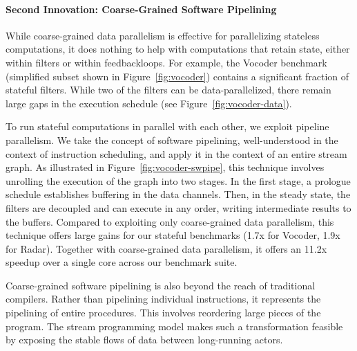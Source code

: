 
\paragraph*{Second Innovation: Coarse-Grained Software Pipelining} While 
coarse-grained data parallelism is effective for parallelizing
stateless computations, it does nothing to help with computations that
retain state, either within filters or within feedbackloops.  For
example, the Vocoder benchmark (simplified subset shown in
Figure~\ref{fig:vocoder}) contains a significant fraction of stateful
filters.  While two of the filters can be data-parallelized, there
remain large gaps in the execution schedule (see
Figure~\ref{fig:vocoder-data}).

To run stateful computations in parallel with each other, we exploit
pipeline parallelism.  We take the concept of software pipelining,
well-understood in the context of instruction scheduling, and apply it
in the context of an entire stream graph.  As illustrated in
Figure~\ref{fig:vocoder-swpipe}, this technique involves unrolling the
execution of the graph into two stages.  In the first stage, a
prologue schedule establishes buffering in the data channels.  Then,
in the steady state, the filters are decoupled and can execute in any
order, writing intermediate results to the buffers.  Compared to
exploiting only coarse-grained data parallelism, this technique offers
large gains for our stateful benchmarks (1.7x for Vocoder, 1.9x for
Radar).  Together with coarse-grained data parallelism, it offers an
11.2x speedup over a single core across our benchmark suite.

Coarse-grained software pipelining is also beyond the reach of
traditional compilers.  Rather than pipelining individual
instructions, it represents the pipelining of entire procedures.  This
involves reordering large pieces of the program.  The stream
programming model makes such a transformation feasible by exposing the
stable flows of data between long-running actors.

